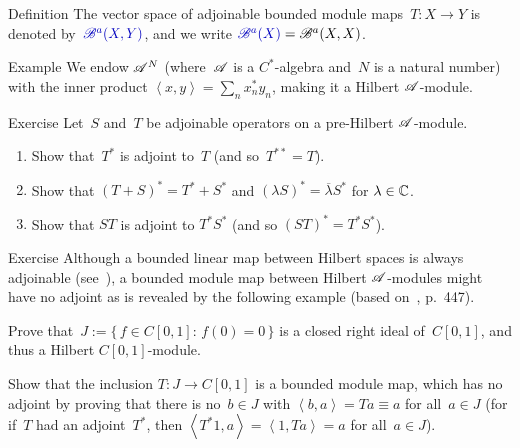 \documentclass[a]{subfiles}
\begin{document}
\begin{parsec}
\begin{point}{Definition}
The vector space of adjoinable bounded module maps~$T\colon X\to Y$ 
is denoted
by~$\Define{\scrB^a(X,Y)}$,%
and we write $\Define{\scrB^a(X)}=\scrB^a(X,X)$.%
\end{point}
\begin{point}{Example}%
We endow $\mathscr{A}^N$
(where~$\mathscr{A}$ is a $C^*$-algebra and~$N$ is a natural number)
with the inner product $\left<x,y\right>=\sum_n x_n^*y_n$,
making it a Hilbert $\mathscr{A}$-module.
\end{point}
\begin{point}{Exercise}%
Let~$S$ and~$T$ be adjoinable operators on a 
pre-Hilbert $\mathscr{A}$-module.
\begin{enumerate}
\item
	Show that~$T^*$ is adjoint to~$T$ (and so~$T^{**}=T$).
\item
Show that $(T+S)^*=T^*+S^*$ 
and $(\lambda S)^*=\overline{\lambda}S^*$ for $\lambda\in \mathbb{C}$.
\item
Show that $ST$ is adjoint to $T^*S^*$
(and so $(ST)^*=T^*S^*$).
\end{enumerate}
\end{point}
\begin{point}{Exercise}%
Although a bounded linear map between Hilbert spaces
is always adjoinable (see~),
a bounded module map
between Hilbert $\mathscr{A}$-modules
might have no adjoint
as is revealed by the following example
(based on~\cite{paschke}, p.~447).

Prove that~$J:=\{\,f\in C[0,1]\colon\, f(0)=0\,\}$
is a closed right ideal of~$C[0,1]$, and thus a
Hilbert $C[0,1]$-module.

Show that the inclusion $T\colon J\to C[0,1]$
is a bounded module map,
which has no adjoint
by proving that there is no~$b\in J$
with $\left<b,a\right>=Ta\equiv a$ for all~$a\in J$
(for if~$T$ had an adjoint~$T^*$,
then $\left<T^*1,a\right>=\left<1,Ta\right>=a$
for all~$a\in J$).


\end{point}
\end{parsec}
\end{document}
